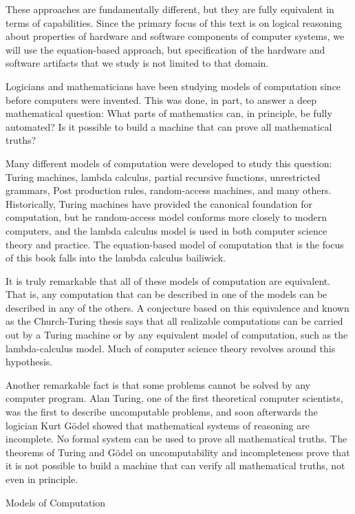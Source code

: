 These approaches are fundamentally different, but they
are fully equivalent in terms of capabilities.
Since the primary focus of this text is on logical reasoning
about properties of hardware and software components of computer systems,
we will use the equation-based approach,
but specification of the hardware and software artifacts that we study
is not limited to that domain.

\begin{aside}
Logicians and mathematicians have been studying
models of computation
since before computers were invented. This was done, in part, to
answer a deep mathematical question: What parts of mathematics can,
in principle, be fully automated?  Is it possible to
build a machine that can prove all mathematical truths?

Many different models of computation were developed to study this question:
Turing machines, lambda calculus,
partial recursive functions,
unrestricted grammars, Post production rules, random-access machines,
and many others.
Historically, Turing machines have provided the canonical foundation for computation,
but he random-access model conforms more closely to modern computers,
and the lambda calculus model is used in both computer science theory and practice.
The equation-based model of computation that is the focus of this book
falls into the lambda calculus bailiwick.

It is truly remarkable that all of these models of
computation are equivalent.  That is,
any computation that can be described in one of the models can
be described in any of the others.
A conjecture based on this equivalence
and known as the Church-Turing thesis
says that all realizable computations can
be carried out by a Turing machine or by
any equivalent model of computation, such as
the lambda-calculus model.
Much of computer science theory
revolves around this hypothesis.

Another remarkable fact is that some problems cannot be solved
by any computer program.
Alan Turing, one of the first theoretical computer scientists,
was the first to describe
uncomputable problems,
and soon afterwards the logician Kurt G\"odel
showed that mathematical systems of reasoning
are incomplete. No formal system can be used
to prove all mathematical truths.
The theorems of Turing and G\"odel on uncomputability and incompleteness
prove that it is not possible to build a machine that can verify all mathematical
truths, not even in principle.

\caption{Models of Computation}
\label{aside-model-of-computation}
\end{aside}

